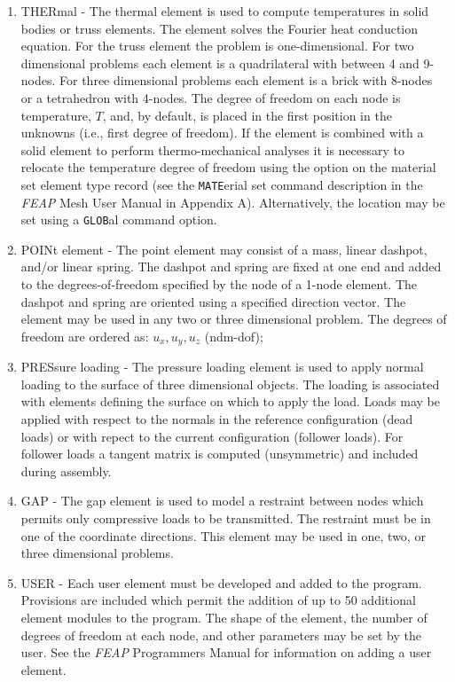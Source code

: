 \begin{enumerate}
\item
THERmal -  The thermal element is used to compute temperatures in solid
bodies or truss elements.  The element solves the Fourier heat conduction
equation.  For the truss element the problem is one-dimensional.
For two dimensional problems each element is a quadrilateral
with between 4 and 9-nodes.  For three dimensional problems each element
is a brick with 8-nodes or a tetrahedron with 4-nodes.
The degree of freedom on each node is temperature, $T$, and, by default,
is placed in the first position in the unknowns (i.e., first degree of freedom).
If the element is combined with a solid element to perform thermo-mechanical
analyses it is necessary to relocate the temperature degree of freedom using
the option on the material set element type record (see the \texttt{MATE}erial
set command description in the {\sl FEAP} Mesh User Manual in Appendix A).
Alternatively, the location may be set using a \texttt{GLOB}al command option.

\item
POINt element - The point element may consist of a mass, linear dashpot, and/or
linear spring. The dashpot and spring are fixed at one end and added to the
degrees-of-freedom specified by the node of a 1-node element.
The dashpot and spring are oriented using a specified direction vector.
The element may be used in any two or three dimensional problem.
The degrees of freedom are ordered as: $u_x , u_y , u_z$ (ndm-dof);

\item
PRESsure loading - The pressure loading element is used to apply normal loading
to the surface of three dimensional objects.  The loading is associated with
elements defining the surface on which to apply the load.  Loads may be applied
with respect to the normals in the reference configuration (dead loads) or
with repect to the current configuration (follower loads).  For follower
loads a tangent matrix is computed (unsymmetric) and included during assembly.

\item
GAP - The gap element is used to model a restraint between nodes
which permits only compressive loads to be transmitted.  The restraint
must be in one of the coordinate directions.  This element may
be used in one, two, or three dimensional problems.

\item
USER -  Each user element must be developed and added to the program.
Provisions are included which permit the addition of up to 50 additional
element modules to the program.
The shape of the element, the number of degrees of freedom at each node,
and other parameters may be set by the user.  See the {\sl FEAP}
Programmers Manual for information on adding a user element.
\end{enumerate}

